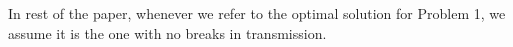 In rest of the paper, whenever we refer to the optimal solution for Problem 1, we assume it is the one with no breaks in transmission.
%
%
%
%
%

